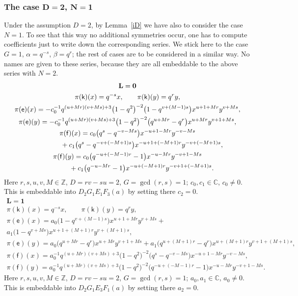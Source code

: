 \documentclass[10pt,a4paper]{amsart}
\numberwithin{equation}{section}
\begin{document}
\subsubsection*{The case $\boldsymbol{D=2}$, $\boldsymbol{N=1}$}

Under the assumption $D=2$, by Lemma~\ref{iD} we have also to consider the case $N=1$. To see that this way no additional symmetries occur, one has to compute coefficients just to write down the corresponding series. We stick here to the case $G=1$, $\alpha=q^{-s}$, $\beta=q^r$; the rest of cases are to be considered in a similar way. No names are given to these series, because they are all embeddable to the above series with $N=2$.
\begin{gather*}
 \mathbf{L}=\mathbf{0}\\
\pi(\mathsf{k})(x)= q^{-s}x ,\qquad\pi(\mathsf{k})(y)=q^ry ,\\
\pi(\mathsf{e})(x)= -c_0^{-1}q^{(u+Mr)(v+Ms)+3}\big(1-q^2\big)^{-2}\big(1-q^{v+(M-1)s}\big)x^{u+1+Mr}y^{v+Ms} ,\\
\pi(\mathsf{e})(y)= -c_0^{-1}q^{(u+Mr)(v+Ms)+3}\big(1-q^2\big)^{-2}\big(q^{u+Mr}-q^r\big)x^{u+Mr}y^{v+1+Ms} ,\\
\pi(\mathsf{f})(x)= c_0\big(q^s-q^{-v-Ms}\big)x^{-u+1-Mr}y^{-v-Ms}\\
\hphantom{\pi(\mathsf{f})(x)=}{} + c_1\big(q^s-q^{-v+(-M+1)s}\big) x^{-u+1+(-M+1)r}y^{-v+(-M+1)s} ,\\
 \pi(\mathsf{f})(y)= c_0\big(q^{-u+(-M-1)r}-1\big)x^{-u-Mr}y^{-v+1-Ms}\\
 \hphantom{\pi(\mathsf{f})(y)=}{} + c_1\big(q^{-u-Mr}-1\big)x^{-u+(-M+1)r}y^{-v+1+(-M+1)s} .
\end{gather*}
Here $r,s,u,v,M\in\mathbb{Z}$, $D=rv-su=2$, $G=\operatorname{gcd}(r,s)=1$; $c_0,c_1\in\mathbb{C}$, $c_0\ne 0$. This is embeddable into $D_2G_1E_1F_3(a)$ by setting there $c_2=0$.
\begin{gather*}
 \mathbf{L}=\mathbf{1}\\
 \pi(\mathsf{k})(x)= q^{-s}x ,\qquad\pi(\mathsf{k})(y)=q^ry ,\\
\pi(\mathsf{e})(x)= a_0\big(1-q^{v+(M-1)s}\big)x^{u+1+Mr}y^{v+Ms}+\\ a_1\big(1-q^{v+Ms}\big)x^{u+1+(M+1)r}y^{v+(M+1)s} ,\\
\pi(\mathsf{e})(y)= a_0\big(q^{u+Mr}-q^r\big)x^{u+Mr}y^{v+1+Ms}+ a_1\big(q^{u+(M+1)r}-q^r\big)x^{u+(M+1)r}y^{v+1+(M+1)s} ,\\
\pi(\mathsf{f})(x)= a_0^{-1}q^{(u+Mr)(v+Ms)+3}\big(1-q^2\big)^{-2}\big(q^s-q^{-v-Ms}\big)x^{-u+1-Mr}y^{-v-Ms} ,\\
\pi(\mathsf{f})(y)= a_0^{-1}q^{(u+Mr)(v+Ms)+3}\big(1-q^2\big)^{-2}\big(q^{-u+(-M-1)r}-1\big)x^{-u-Mr}y^{-v+1-Ms} .
\end{gather*}
Here $r,s,u,v,M\in\mathbb{Z}$, $D=rv-su=2$, $G=\operatorname{gcd}(r,s)=1$; $a_0,a_1\in\mathbb{C}$, $a_0\ne 0$. This is embeddable into $D_2G_1E_3F_1(a)$ by setting there $a_2=0$.
\end{document}
